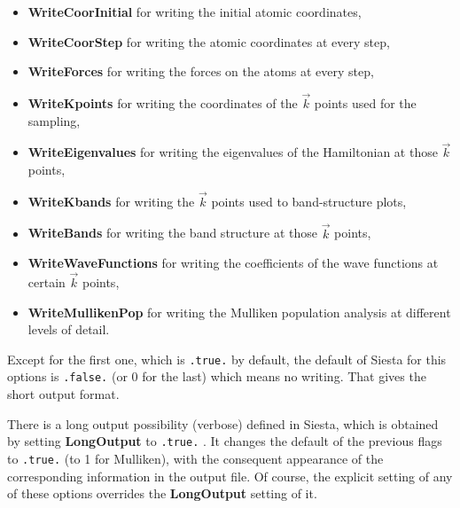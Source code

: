 \documentclass[11pt]{article}
\begin{document}
\begin{itemize}
\item
{\bf WriteCoorInitial}
for writing the initial atomic coordinates,
\item
{\bf WriteCoorStep}
for writing the atomic coordinates at every step,
\item
{\bf WriteForces}
for writing the forces on the atoms at every step,
\item
{\bf WriteKpoints}
for writing the coordinates of the $\vec k$ points used for the sampling,
\item
{\bf WriteEigenvalues}
for writing the eigenvalues of the Hamiltonian at those $\vec k$ points,
\item
{\bf WriteKbands}
for writing the $\vec k$ points used to band-structure plots,
\item
{\bf WriteBands}
for writing the band structure at those $\vec k$ points,
\item
{\bf WriteWaveFunctions}
for writing the coefficients of the wave functions at
certain $\vec k$ points,
\item
{\bf WriteMullikenPop}
for writing the Mulliken population analysis at different levels of detail.
\end{itemize}

Except for the first one, which is {\tt .true.} by default, the
default of {\sc Siesta} for this options is {\tt .false.} (or 0 for the last)
which means no writing. That gives the short output format.

There is a long output possibility (verbose) defined in {\sc Siesta}, which is
obtained by setting {\bf LongOutput} to {\tt .true.} . It changes 
the default of the previous flags to {\tt .true.} (to 1 for 
Mulliken), with the consequent appearance of the 
corresponding information in the output file.
Of course, the explicit setting of any of these options overrides the
{\bf LongOutput} setting of it.
\end{document}
